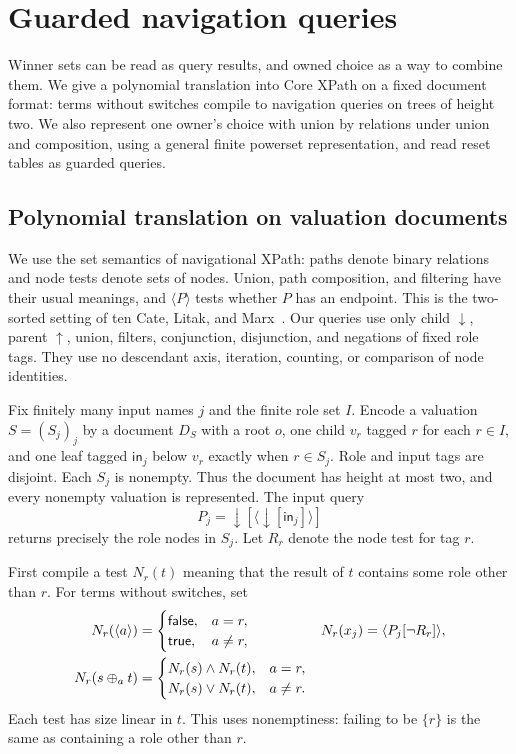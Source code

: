 \section{Guarded navigation queries}\label{app:queries}

Winner sets can be read as query results, and owned choice as a way to
combine them. We give a polynomial translation into Core XPath on a
fixed document format: terms without switches compile to navigation
queries on trees of height two. We also represent one owner's choice
with union by relations under union and composition, using a general
finite powerset representation, and read reset tables as guarded queries.

\subsection{Polynomial translation on valuation documents}

We use the set semantics of navigational XPath: paths denote binary
relations and node tests denote sets of nodes. Union, path composition,
and filtering have their usual meanings, and $\langle P\rangle$ tests
whether $P$ has an endpoint. This is the two-sorted setting of
ten Cate, Litak, and Marx~\cite{TenCateLitakMarx2010}. Our queries use
only child $\downarrow$, parent $\uparrow$, union, filters, conjunction,
disjunction, and negations of fixed role tags. They use no descendant
axis, iteration, counting, or comparison of node identities.

Fix finitely many input names $j$ and the finite role set $I$. Encode a
valuation $S=(S_j)_j$ by a document $D_S$ with a root $o$, one child
$v_r$ tagged $r$ for each $r\in I$, and one leaf tagged
$\mathsf{in}_j$ below $v_r$ exactly when $r\in S_j$. Role and input
tags are disjoint. Each $S_j$ is nonempty. Thus the document has height
at most two, and every nonempty valuation is represented. The input query
\[
 P_j=\downarrow[\langle\downarrow[\mathsf{in}_j]\rangle]
\]
returns precisely the role nodes in $S_j$. Let $R_r$ denote the node test
for tag $r$.

First compile a test $N_r(t)$ meaning that the result of $t$ contains
some role other than $r$. For terms without switches, set
\begin{align*}
 N_r(\langle a\rangle)&=\begin{cases}\mathsf{false},&a=r,\\
                         \mathsf{true},&a\ne r,\end{cases}
 &N_r(x_j)&=\langle P_j[\neg R_r]\rangle,\\
 N_r(s\mathbin{\oplus_{a}} t)&=\begin{cases}
 N_r(s)\land N_r(t),&a=r,\\
 N_r(s)\lor N_r(t),&a\ne r.
 \end{cases}
\end{align*}
Each test has size linear in $t$. This uses nonemptiness: failing to be
$\{r\}$ is the same as containing a role other than $r$.

